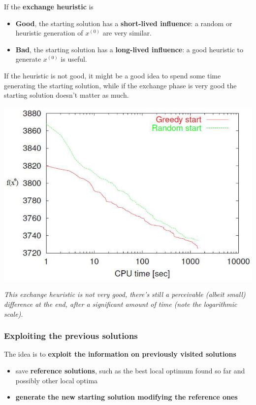 If the \textbf{exchange heuristic} is
\begin{itemize}
	\item \textbf{Good}, the starting solution has a \textbf{short-lived influence}: a random or heuristic generation of $x^{(0)}$ are very similar.\\
	
	\item \textbf{Bad}, the starting solution has a \textbf{long-lived influence}: a good heuristic to generate $x^{(0)}$ is useful.\\
\end{itemize}
If the heuristic is not good, it might be a good idea to spend some time generating the starting solution, while if the exchange phase is very good the starting solution doesn't matter as much.\\

\begin{center}
	\includegraphics[width=0.8\columnwidth]{img/influence1}
\end{center}
\textit{This exchange heuristic is not very good, there's still a perceivable (albeit small) difference at the end, after a significant amount of time (note the logarithmic scale).}

\newpage

\subsubsection{Exploiting the previous solutions}
The idea is to \textbf{exploit the information on previously visited solutions}
\begin{itemize}
	\item save \textbf{reference solutions}, such as the best local optimum found so far and possibly other local optima
	
	\item \textbf{generate the new starting solution modifying the reference ones}
\end{itemize}


